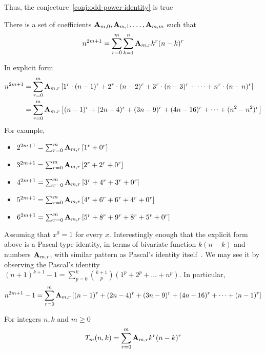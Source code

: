 Thus, the conjecture~\eqref{conj:odd-power-identity} is true

\begin{theorem}
    \label{theorem:odd-power-identity}
    There is a set of coefficients ${\mathbf{A}} \sb{m,0}, {\mathbf{A}} \sb{m,1}, \ldots, {\mathbf{A}} \sb{m,m}$ such that
    \begin{align*}
        n^{2m+1} = \sum_{r=0}^{m} \sum_{k=1}^{n} {\mathbf{A}} \sb{m,r} k^r (n-k)^r
    \end{align*}
\end{theorem}
In explicit form
\begin{align*}
    n^{2m+1} &= \sum_{r=0}^{m} {\mathbf{A}} \sb{m,r} \left[ 1^r \cdot (n-1)^r + 2^r \cdot (n-2)^r + 3^r \cdot (n-3)^r + \cdots + n^r \cdot (n-n)^r  \right] \\
             &= \sum_{r=0}^{m} {\mathbf{A}} \sb{m,r} \left[ (n-1)^r + (2n-4)^r + (3n-9)^r + (4n-16)^r + \cdots +  (n^2-n^2)^r  \right]
\end{align*}
For example,
\begin{itemize}
    \item $2^{2m+1} = \sum_{r=0}^{m} {\mathbf{A}} \sb{m,r} \left[ 1^r + 0^r  \right]$
    \item $3^{2m+1} = \sum_{r=0}^{m} {\mathbf{A}} \sb{m,r} \left[ 2^r + 2^r + 0^r  \right]$
    \item $4^{2m+1} = \sum_{r=0}^{m} {\mathbf{A}} \sb{m,r} \left[ 3^r + 4^r + 3^r + 0^r  \right]$
    \item $5^{2m+1} = \sum_{r=0}^{m} {\mathbf{A}} \sb{m,r} \left[ 4^r + 6^r + 6^r + 4^r + 0^r  \right]$
    \item $6^{2m+1} = \sum_{r=0}^{m} {\mathbf{A}} \sb{m,r} \left[ 5^r + 8^r + 9^r + 8^r + 5^r + 0^r  \right]$
\end{itemize}
Assuming that $x^0=1$ for every $x$.
Interestingly enough that the explicit form above is a Pascal-type identity,
in terms of bivariate function $k(n-k)$ and numbers ${\mathbf{A}} \sb{m,r}$,
with similar pattern as Pascal's identity itself~\cite{macmillan2011proofs}.
We may see it by observing the Pascal's identity $(n+1)^{k+1}-1=\sum _{p=0}^{k}{\binom {k+1}{p}}(1^{p}+2^{p}+\dots +n^{p})$.
In particular,
\begin{align*}
    n^{2m+1} - 1
    = \sum_{r=0}^{m} {\mathbf{A}} \sb{m,r} \left[ (n-1)^r + (2n-4)^r + (3n-9)^r + (4n-16)^r + \cdots +  (n-1)^r  \right]
\end{align*}
\begin{definition}
    For integers $n,k$ and $m \geq 0$
    \label{def:bivariate-sum-Tm}
    \begin{align*}
        T_{m}(n,k) = \sum_{r=0}^{m} {\mathbf{A}} \sb{m,r} k^r (n-k)^r
    \end{align*}
\end{definition}

